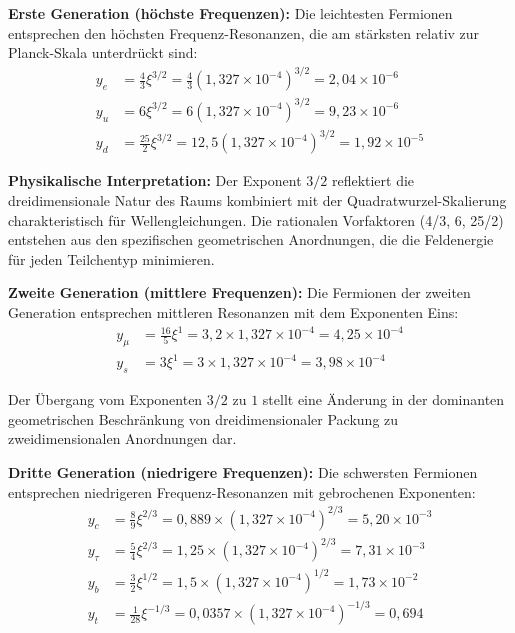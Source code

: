\documentclass[12pt,a4paper]{article}
\newcommand{\xipar}{\xi}
\begin{document}
	\textbf{Erste Generation (höchste Frequenzen):} Die leichtesten Fermionen entsprechen den höchsten Frequenz-Resonanzen, die am stärksten relativ zur Planck-Skala unterdrückt sind:
	\begin{align}
		y_e &= \frac{4}{3} \xipar^{3/2} = \frac{4}{3} (1{,}327 \times 10^{-4})^{3/2} = 2{,}04 \times 10^{-6} \\
		y_u &= 6 \xipar^{3/2} = 6 (1{,}327 \times 10^{-4})^{3/2} = 9{,}23 \times 10^{-6} \\
		y_d &= \frac{25}{2} \xipar^{3/2} = 12{,}5 (1{,}327 \times 10^{-4})^{3/2} = 1{,}92 \times 10^{-5}
	\end{align}
	
	\textbf{Physikalische Interpretation:} Der Exponent $3/2$ reflektiert die dreidimensionale Natur des Raums kombiniert mit der Quadratwurzel-Skalierung charakteristisch für Wellengleichungen. Die rationalen Vorfaktoren (4/3, 6, 25/2) entstehen aus den spezifischen geometrischen Anordnungen, die die Feldenergie für jeden Teilchentyp minimieren.
	
	\textbf{Zweite Generation (mittlere Frequenzen):} Die Fermionen der zweiten Generation entsprechen mittleren Resonanzen mit dem Exponenten Eins:
	\begin{align}
		y_{\mu} &= \frac{16}{5} \xipar^1 = 3{,}2 \times 1{,}327 \times 10^{-4} = 4{,}25 \times 10^{-4} \\
		y_s &= 3 \xipar^1 = 3 \times 1{,}327 \times 10^{-4} = 3{,}98 \times 10^{-4}
	\end{align}
	
	Der Übergang vom Exponenten $3/2$ zu $1$ stellt eine Änderung in der dominanten geometrischen Beschränkung von dreidimensionaler Packung zu zweidimensionalen Anordnungen dar.
	
	\textbf{Dritte Generation (niedrigere Frequenzen):} Die schwersten Fermionen entsprechen niedrigeren Frequenz-Resonanzen mit gebrochenen Exponenten:
	\begin{align}
		y_c &= \frac{8}{9} \xipar^{2/3} = 0{,}889 \times (1{,}327 \times 10^{-4})^{2/3} = 5{,}20 \times 10^{-3} \\
		y_{\tau} &= \frac{5}{4} \xipar^{2/3} = 1{,}25 \times (1{,}327 \times 10^{-4})^{2/3} = 7{,}31 \times 10^{-3} \\
		y_b &= \frac{3}{2} \xipar^{1/2} = 1{,}5 \times (1{,}327 \times 10^{-4})^{1/2} = 1{,}73 \times 10^{-2} \\
		y_t &= \frac{1}{28} \xipar^{-1/3} = 0{,}0357 \times (1{,}327 \times 10^{-4})^{-1/3} = 0{,}694
	\end{align}
	
\end{document}
